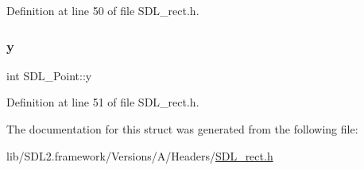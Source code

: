 Definition at line 50 of file S\+D\+L\+\_\+rect.\+h.

\mbox{\label{struct_s_d_l___point_aaa68aefa869f6bdf46367a70bd9414b0}} 
\subsubsection{\texorpdfstring{y}{y}}
{\footnotesize\ttfamily int S\+D\+L\+\_\+\+Point\+::y}



Definition at line 51 of file S\+D\+L\+\_\+rect.\+h.



The documentation for this struct was generated from the following file\+:\begin{DoxyCompactItemize}
\item 
lib/\+S\+D\+L2.\+framework/\+Versions/\+A/\+Headers/\mbox{\hyperlink{_s_d_l__rect_8h}{S\+D\+L\+\_\+rect.\+h}}\end{DoxyCompactItemize}
